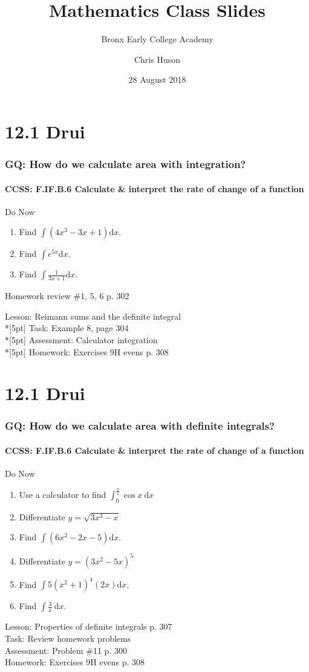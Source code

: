 \documentclass{beamer}
\title{Mathematics Class Slides}
\subtitle{Bronx Early College Academy}
\author{Chris Huson}
\date{28 August 2018}
\begin{document}
\frame{\titlepage}

 
  \section{12.1 Drui}
  \frame
  {
    \frametitle{GQ: How do we calculate area with integration?}
    \framesubtitle{CCSS: F.IF.B.6 Calculate \& interpret the rate of change of a function}

    \begin{block}{Do Now}
    \begin{enumerate}
        \item Find $\int{(4x^3-3x+1)}\mathrm{d}x$.
        \item Find $\int e^{5x}\mathrm{d}x$.
        \item Find $\displaystyle \int \frac{1}{3x+1} \mathrm{d}x$.
    \end{enumerate}
    Homework review \#1, 5, 6 p. 302
    \end{block}
    Lesson: Reimann sums and the definite integral\\*[5pt]
    Task: Example 8, page 304\\*[5pt]
    Assessment: Calculator integration \\*[5pt]
    Homework: Exercises 9H evens p. 308
  }

  \section{12.1 Drui}
  \frame
  {
    \frametitle{GQ: How do we calculate area with definite integrals?}
    \framesubtitle{CCSS: F.IF.B.6 Calculate \& interpret the rate of change of a function}

    \begin{block}{Do Now}
    \begin{enumerate}
        \item Use a calculator to find $\displaystyle \int_0^{\frac{\pi}{2}}{\cos x}\ \mathrm{d}x$
        \item Differentiate $y=\sqrt{3x^3-x}$
        \item Find $\int{(6x^2-2x-5)}\mathrm{d}x$.
        \item Differentiate $y={(3x^2-5x)^5}$
        \item Find $\int 5(x^2+1)^4(2x)\mathrm{d}x$.
        \item Find $\displaystyle \int \frac{3}{x}\ \mathrm{d}x$.
    \end{enumerate}
    \end{block}
    Lesson: Properties of definite integrals p. 307\\%
    Task: Review homework problems\\%
    Assessment: Problem \#11 p. 300 \\%
    Homework: Exercises 9H evens p. 308
  }
\end{document}
